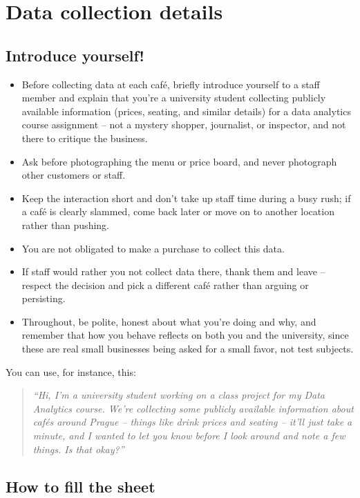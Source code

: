 \documentclass[11pt,a4paper]{article}
\begin{document}
\appendix
\clearpage
\section{Data collection details}\label{sec:collectiondetails}

\subsection*{Introduce yourself!}

\begin{itemize}
\item Before collecting data at each caf\'e, briefly introduce yourself to a staff member and explain that you're a university student collecting publicly available information (prices, seating, and similar details) for a data analytics course assignment -- not a mystery shopper, journalist, or inspector, and not there to critique the business.
\item Ask before photographing the menu or price board, and never photograph other customers or staff.
\item Keep the interaction short and don't take up staff time during a busy rush; if a caf\'e is clearly slammed, come back later or move on to another location rather than pushing.
\item You are not obligated to make a purchase to collect this data.
\item If staff would rather you not collect data there, thank them and leave -- respect the decision and pick a different caf\'e rather than arguing or persisting.
\item Throughout, be polite, honest about what you're doing and why, and remember that how you behave reflects on both you and the university, since these are real small businesses being asked for a small favor, not test subjects.
\end{itemize}

You can use, for instance, this:
\begin{quote}
\itshape ``Hi, I'm a university student working on a class project for my Data Analytics course. We're collecting some publicly available information about caf\'es around Prague -- things like drink prices and seating -- it'll just take a minute, and I wanted to let you know before I look around and note a few things. Is that okay?''
\end{quote}

\subsection*{How to fill the sheet}
\end{document}
